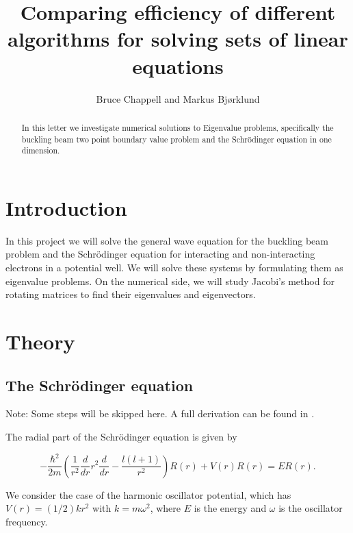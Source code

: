 \documentclass{emulateapj}
\begin{document}
\title{Comparing efficiency of different algorithms for solving sets of linear equations}

\author{Bruce Chappell and Markus Bjørklund}



\begin{abstract}
In this letter we investigate numerical solutions to Eigenvalue problems, specifically the buckling beam two point boundary value problem and the Schrödinger equation in one dimension.

\end{abstract}

\section{Introduction}
\label{sec:introduction}
In this project we will solve the general wave equation for the buckling beam problem and the Schrödinger equation for interacting and non-interacting electrons in a potential well. We will solve these systems by formulating them as eigenvalue problems. On the numerical side, we will study Jacobi's method for rotating matrices to find their eigenvalues and eigenvectors.

\section{Theory}
\label{sec:method}
\subsection{The Schrödinger equation}

Note: Some steps will be skipped here. A full derivation can be found in \cite{Project}.

The radial part of the Schrödinger equation is given by

\begin{equation}
  -\frac{\hbar^2}{2 m} \left ( \frac{1}{r^2} \frac{d}{dr} r^2
  \frac{d}{dr} - \frac{l (l + 1)}{r^2} \right )R(r)
     + V(r) R(r) = E R(r).
\end{equation}

We consider the case of the harmonic oscillator potential, which has $V(r) = (1/2)kr^2$ with $k=m\omega^2$, where $E$ is the energy and $\omega$ is the oscillator frequency.
\end{document}
